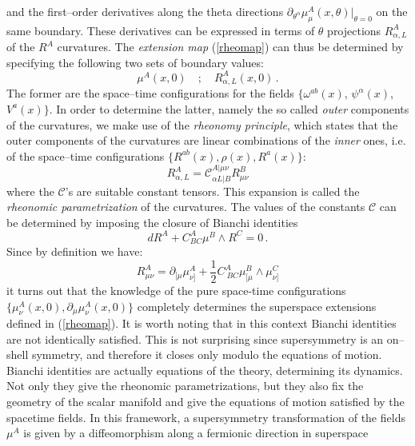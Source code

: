 \documentclass[a4paper,12pt]{article}
\newcommand{\ft}[2]{{\textstyle\frac{#1}{#2}}}
\begin{document}
and  the first--order derivatives along the theta
directions $\partial_{\theta^{\alpha}}\mu^A_{\mu}(x,\theta)|_{\theta =0}$
on the same boundary.
These derivatives can be expressed in terms of  $\theta$ projections
$R^A_{\alpha,L}$ of the $R^A$ curvatures.
The {\it extension map} (\ref{rheomap}) can thus be determined by
specifying the following two sets of boundary
values:
\begin{equation}
\mu^A(x,0) \quad ; \quad R^A_{\alpha,L}(x,0)\,.
\end{equation}
The former are the space--time configurations for the fields
$\{\omega^{ab}(x)$, $\psi^{\alpha}(x)$, $V^a(x)\}$. In order to determine the latter,
namely the so called {\sl outer} components of
the curvatures,
we make use of the {\sl rheonomy principle}, which states that the
outer
components of the curvatures are linear combinations of the {\sl inner} ones, i.e. of the
space--time configurations $\{R^{ab}(x),\rho(x),R^a(x)\}$:
\begin{equation}
\label{rheoconstraints}
R^A_{\alpha,L} = \mathcal{C}^{A|\mu\nu}_{\alpha L|B}R^B_{\mu\nu}
\end{equation}
where the $\mathcal{C}$'s are suitable constant tensors.
This expansion is called the {\sl  rheonomic parametrization}
of the curvatures.
The values of the constants $\mathcal{C}$ can be determined by imposing the closure of
Bianchi identities
\begin{equation}
dR^A+C^A_{BC}\mu^B\wedge R^C=0\,.
\end{equation}
Since by definition we have:
\begin{equation}
R^A_{\mu\nu}=\partial_{[\mu}\mu^A_{\nu]}+{\ft 1 2} C^A_{~BC}\mu^B_{[\mu}\wedge\mu^C_{\nu]}
\end{equation}
it turns out that the knowledge of the pure space-time configurations
$\{\!\mu_{\nu}^A(x,0),\!\partial_{\mu}\mu^A_{\nu}(x,0)\!\}$
completely determines the superspace extensions defined in (\ref{rheomap}).
It is worth noting that in this context  Bianchi
identities are not identically satisfied. This
is not surprising since supersymmetry is an on--shell symmetry,
and therefore it closes only modulo the equations of motion.
Bianchi identities are actually
equations of the theory, determining its dynamics.  Not only they give the
rheonomic parametrizations, but they also fix the geometry of the scalar manifold
and give the equations of motion satisfied by the spacetime fields.
In this framework, a supersymmetry transformation of the fields $\mu^A$ is
given by a diffeomorphism along a fermionic direction in superspace
\end{document}
